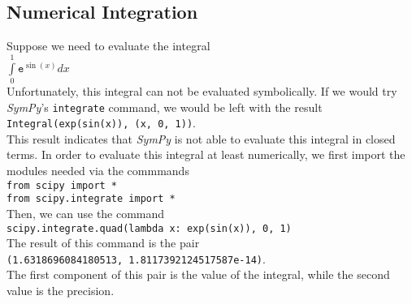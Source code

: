 \documentclass{article}
\begin{document}
\subsection{Numerical Integration}
Suppose we need to evaluate the integral
\\[0.2cm]
\hspace*{1.3cm}
$\displaystyle \int\limits_{0}^{1} \mathtt{e}^{\sin(x)} dx$
\\[0.2cm]
Unfortunately, this integral can not be evaluated symbolically.  If we would try \textsl{SymPy}'s
\texttt{integrate} command, we would be left with the result
\\[0.2cm]
\hspace*{1.3cm}
\texttt{Integral(exp(sin(x)), (x, 0, 1))}.
\\[0.2cm]
This result indicates that \textsl{SymPy} is not able to evaluate this integral in closed terms.
In order to evaluate this integral at least numerically, we first import the modules needed via the
commmands
\\[0.2cm]
\hspace*{1.3cm}
\texttt{from scipy import *} \\
\hspace*{1.3cm}
\texttt{from scipy.integrate import *}
\\[0.2cm]
Then, we can use the command
\\[0.2cm]
\hspace*{1.3cm}
\texttt{scipy.integrate.quad(lambda x: exp(sin(x)), 0, 1)}
\\[0.2cm]
The result of this command is the pair
\\[0.2cm]
\hspace*{1.3cm}
\texttt{(1.6318696084180513, 1.8117392124517587e-14)}.
\\[0.2cm]
The first component of this pair is the value of the integral, while the second value is the
precision.
\end{document}
